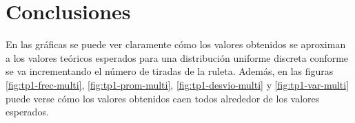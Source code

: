 \documentclass{article}
\begin{document}
\section{Conclusiones}

En las gráficas se puede ver claramente cómo los valores obtenidos se aproximan a los valores teóricos esperados para una distribución uniforme discreta conforme se va incrementando el número de tiradas de la ruleta. Además, en las figuras \ref{fig:tp1-frec-multi}, \ref{fig:tp1-prom-multi}, \ref{fig:tp1-desvio-multi} y \ref{fig:tp1-var-multi} puede verse cómo los valores obtenidos caen todos alrededor de los valores esperados.



\end{document}
